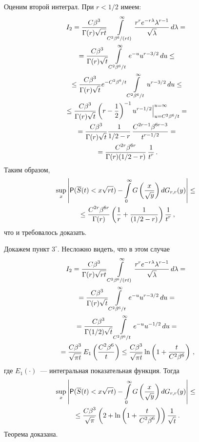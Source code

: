 \begin{multicols}{2}
Оценим второй интеграл. При $r<1/2$ имеем:
\begin{multline*}
I_2=\fr{C\beta^3}{\Gamma(r)\sqrt{ r
t}}\int\limits_{C^2\beta^6/(rt)}^{\infty}\fr{r^r
e^{-r\lambda}\lambda^{r-1} }{\sqrt{\lambda}}\,d\lambda
={}\\
{}=\fr{C\beta^3}{\Gamma(r)\sqrt{t}}
\int\limits_{C^2\beta^6/t}^{\infty}e^{-u}u^{r-3/2}\,du\le{}\\
{}
\le\fr{C\beta^3}{\Gamma(r)\sqrt{t}}e^{-C^2\beta^6/t}
\int\limits_{C^2\beta^6/t}^{\infty}u^{r-3/2}\,du\le{}\\
{}\le
\fr{C\beta^3}{\Gamma(r)\sqrt{t}}\left(r-\fr{1}{2}\right)^{-1}
u^{r-1/2}\Big|_{u=C^2\beta^6/t}^{u=\infty}={}\\
{}
=\fr{C\beta^3}{\Gamma(r)\sqrt{t}}\fr{1}{1/2-r}\,
\fr{C^{2r-1}\beta^{6r-3}}{t^{r-1/2}}={}\\
{}=
\fr{C^{2r}\beta^{6r}}{\Gamma(r)(1/2-r)}\,\fr{1}{t^r}\,.
\end{multline*}
Таким образом,
\begin{multline*}
 \sup\limits_x\left\vert{\sf P}(\overline S(t)<x\sqrt{rt})-\int\limits_{0}^{\infty}
G\left(\fr{x}{\sqrt{y}}\right)dG_{r,r}(y)\right\vert \le{}\\
{}\le
\fr{C^{2r}\beta^{6r}}{\Gamma(r)}\left(\fr{1}{r}+\fr{1}{(1/2-r)}\right)\fr{1}{t^r}\,,
\end{multline*}
что и требовалось доказать.


Докажем пункт $3^{\circ}$. Несложно видеть, что в этом случае
\begin{multline*}
I_2=\fr{C\beta^3}{\Gamma(r)\sqrt{ r
t}}\int\limits_{C^2\beta^6/(rt)}^{\infty}\fr{r^r
e^{-r\lambda}\lambda^{r-1} }{\sqrt{\lambda}}\,d\lambda
={}\\
{}=\fr{C\beta^3}{\Gamma(r)\sqrt{t}}\int\limits_{C^2\beta^6/t}^{\infty}e^{-u}u^{r-3/2}\,du={}
\\{}
=\fr{C\beta^3}{\Gamma(1/2)\sqrt{t}}\int\limits_{C^2\beta^6/t}^{\infty}e^{-u}u^{-1/2}\,du={}\\
{}=
\fr{C\beta^3}{\sqrt{\pi t}}\,E_1\left(\fr{C^2\beta^6}t\right)\le
\fr{C\beta^3}{\sqrt{\pi t}}\ln\left(1+\frac{t}{C^2\beta^6}\right)\,,
\end{multline*}
где $E_1(\cdot)$~--- интегральная показательная функция. Тогда
\begin{multline*}
\sup\limits_x\left\vert{\sf P}(\overline
S(t)<x\sqrt{rt})-\int\limits_{0}^{\infty}
G\left(\fr{x}{\sqrt{y}}\right)dG_{r,r}(y)\right\vert 
\le{}\\
{}\le
\fr{C\beta^3}{\sqrt{\pi}}\left(2+\ln\left(1+\fr{t}{C^2\beta^6}\right)\right)
\fr{1}{\sqrt{t}}\,.
\end{multline*}
Теорема доказана.


\end{multicols}

